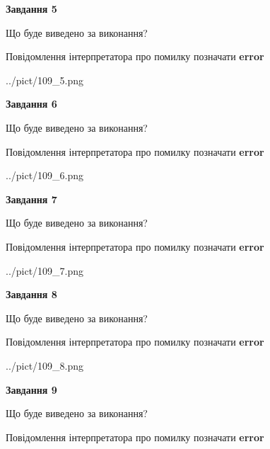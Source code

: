 \documentclass[11pt, ukrainian]{article}
\begin{document}
{\begin {large}
{\begin {center}\textbf{Завдання 5}\end {center}}\par
Що буде виведено за виконання? \par
Повідомлення інтерпретатора про помилку позначати \textbf{error}

\begin{center}
	{../pict/109_5.png}
\end{center}
\newpage

{\begin {center}\textbf{Завдання 6}\end {center}}\par
Що буде виведено за виконання? \par
Повідомлення інтерпретатора про помилку позначати \textbf{error}

\begin{center}
	{../pict/109_6.png}
\end{center}
\newpage

{\begin {center}\textbf{Завдання 7}\end {center}}\par
Що буде виведено за виконання? \par
Повідомлення інтерпретатора про помилку позначати \textbf{error}

\begin{center}
	{../pict/109_7.png}
\end{center}
\newpage

{\begin {center}\textbf{Завдання 8}\end {center}}\par
Що буде виведено за виконання? \par
Повідомлення інтерпретатора про помилку позначати \textbf{error}

\begin{center}
	{../pict/109_8.png}
\end{center}
\newpage

{\begin {center}\textbf{Завдання 9}\end {center}}\par
Що буде виведено за виконання? \par
Повідомлення інтерпретатора про помилку позначати \textbf{error}


\end{large}}
\end{document}

